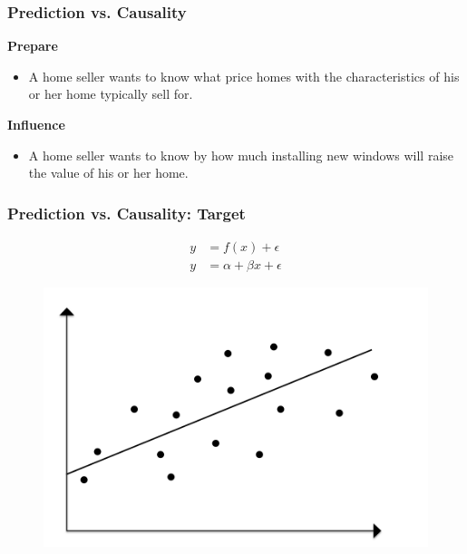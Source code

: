 \documentclass[
  shownotes,
  xcolor={svgnames},
  hyperref={colorlinks,citecolor=DarkBlue,linkcolor=andesred,urlcolor=DarkBlue}
  , aspectratio=169]{beamer}
\begin{document}
\begin{frame}
\frametitle{Prediction vs. Causality}



\begin{minipage}[t]{0.45\linewidth}
       \begin{center}
        {\bf Prepare}
       \end{center}
       

       \begin{itemize}
       \item A home seller wants to know what price homes with the characteristics of his or her home typically sell for.
       \end{itemize}
    \end{minipage}
    \hfill
    \begin{minipage}[t]{0.45\linewidth}%
    \begin{center}
        {\bf Influence}
       \end{center}
        

       \begin{itemize}
       \item A home seller wants to know by how much installing new windows will raise the value of his or her home.
       \end{itemize}
    
    \end{minipage}

\end{frame}


\begin{frame}
\frametitle{Prediction vs. Causality: Target}

\begin{align}
y&= f(x) +\epsilon \\
y&= \alpha + \beta x +\epsilon 
\end{align}
  \begin{figure}[H] \centering
            \captionsetup{justification=centering}  
            \includegraphics[scale=0.4]{figures/target1.png}
            
    \end{figure}

\end{frame}
\end{document}
